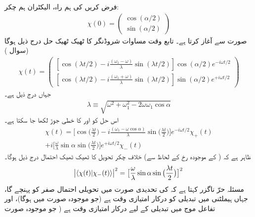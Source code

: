 فرض کریں  کی ہم راہ، الیکٹران ہم چکر:
\begin{align}
\chi (0) = 
\begin{pmatrix} 
\cos(\alpha/2) \\[0.5em]
\sin(\alpha/2)
\end{pmatrix}
\end{align}
 صورت سے آغاز کرتا ہے۔ تابع وقت مساوات شروڈنگر کا ٹھیک ٹھیک حل درج ذیل ہوگا (سوال )
\begin{align}\label{مساوات_حر_حل_مخصوص_ہیملٹنی}
\chi (t) = 
\begin{pmatrix}
[\cos(\lambda t/2) - i \frac{(\omega_1 - \omega)}{\lambda} \sin(\lambda t/2)] \cos(\alpha/2) e^{- i \omega t/2} \\[0.5em]
[\cos(\lambda t/2) - i \frac{(\omega_1 + \omega)}{\lambda} \sin(\lambda t/2)] \sin(\alpha/2) e^{+ i \omega t/2}
\end{pmatrix}
\end{align}
جہاں  درج ذیل ہے۔
\begin{align}
\lambda \equiv \sqrt{\omega^2 + \omega_1^2 - 2 \omega \omega_1 \cos \alpha}
\end{align}
اس حل کو  اور  کا خطی جوڑ لکھا جا سکتا ہے۔
\begin{multline}\label{مساوات_حر_حل_خطی_جوڑ}
\chi (t) = \big [ \cos\big ( \frac{\lambda t}{2} \big ) - i \frac{(\omega_1 - \omega \cos \alpha)}{\lambda} \sin\big ( \frac{\lambda t}{2} \big ) \big ] e^{- i \omega t/2} \chi_{+} (t) \\
+ i \big [ \frac{\omega}{\lambda} \sin \alpha \sin \big ( \frac{\lambda t}{2} \big ) \big ] e^{+ i \omega t/2} \chi_- (t)
\end{multline}
ظاہر ہے کہ ( کے موجودہ رخ کے لحاظ سے) خلاف چکر تحویل کا ٹھیک ٹھیک احتمال درج ذیل ہوگا۔ 
\begin{align}\label{مساوات_حر_تحویلی_احتمال}
\abs{\langle \chi (t) | \chi_{-} (t) \rangle}^2 = \big [ \frac{\omega}{\lambda} \sin \alpha \sin \big ( \frac{\lambda t}{2} \big ) \big ]^2
\end{align}
مسئلہ حرّ ناگزر کہتا ہے کہ  کی تحدیدی صورت میں تحویلی احتمال صفر کو پہنچے گا، جہاں ہیملٹنی میں تبدیلی کو درکار امتیازی وقت  ہے (جو موجودہ صورت میں  ہوگا)، اور تفاعل موج میں تبدیلی کے لیے درکار امتیازی وقت  ہے ( جو موجودہ صورت 

